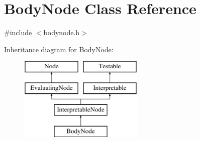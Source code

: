 \hypertarget{classBodyNode}{}\section{Body\+Node Class Reference}
\label{classBodyNode}


{\ttfamily \#include $<$bodynode.\+h$>$}

Inheritance diagram for Body\+Node\+:\begin{figure}[H]
\begin{center}
\leavevmode
\includegraphics[height=4.000000cm]{classBodyNode}
\end{center}
\end{figure}
